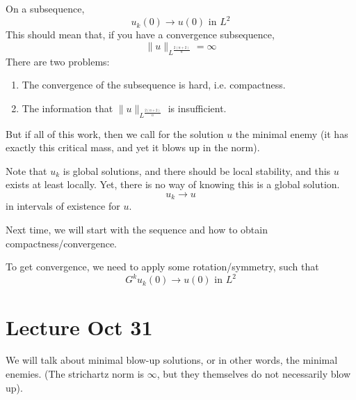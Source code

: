 On a subsequence, 
\begin{equation*}
    u_k(0)\to u(0) \text{ in } L^2
\end{equation*}
This should mean that, if you have a convergence subsequence,
\begin{equation*}
    \|u\|_{L^\frac{2(n+2)}{n}}=\infty
\end{equation*}
There are two problems:
\begin{enumerate}
    \item The convergence of the subsequence is hard, i.e. compactness.
    \item The information that $\|u\|_{L^\frac{2(n+2)}{n}}$ is insufficient.
\end{enumerate}

But if all of this work, then we call for the solution $u$ the minimal enemy (it has exactly this critical mass, and yet it blows up in the norm).

Note that $u_k$ is global solutions, and there should be local stability, and this $u$ exists at least locally. Yet, there is no way of knowing this is a global solution.
\begin{equation*}
    u_k\to u
\end{equation*}
in intervals of existence for $u$.

Next time, we will start with the sequence and how to obtain compactness/convergence.
\begin{note}
    To get convergence, we need to apply some rotation/symmetry, such that
    \begin{equation*}
        G^ku_k(0)\to u(0)\text{ in } L^2
    \end{equation*}
\end{note}


\section{Lecture Oct 31}
We will talk about minimal blow-up solutions, or in other words, the minimal enemies. (The strichartz norm is $\infty$, but they themselves do not necessarily blow up).

